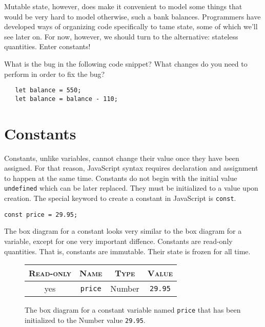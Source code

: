  Mutable state, however, does make it convenient to model some things that would be very hard to model otherwise, such a bank balances. Programmers have developed ways of organizing code specifically to tame state, some of which we'll see later on. For now, however, we should turn to the alternative: stateless quantities. Enter constants!

 \begin{question}
   What is the bug in the following code snippet? What changes do you need to perform in order to fix the bug?
   \begin{lstlisting}
   let balance = 550;
   let balance = balance - 110;
   \end{lstlisting}
 \end{question}

\section{Constants}
Constants, unlike variables, cannot change their value once they have been assigned. For that reason, JavaScript syntax requires declaration and assignment to happen at the same time. Constants do not begin with the initial value \texttt{undefined} which can be later replaced. They must be initialized to a value upon creation. The special keyword to create a constant in JavaScript is \texttt{const}.

\begin{lstlisting}
const price = 29.95;
\end{lstlisting}

The box diagram for a constant looks very similar to the box diagram for a variable, except for one very important diffence. Constants are read-only quantities. That is, constants are immutable. Their state is frozen for all time.

\begin{figure}[h]
  \sffamily
  \color{cyan}
  \begin{tabular}{|c|c|c|c|}
    \hline
    \textsc{Read-only} & \textsc{Name} & \textsc{Type} & \textsc{Value}\\
    \hline
    yes & \texttt{price} & Number & \texttt{29.95}\\
    \hline
  \end{tabular}
  \caption{\label{fig:intro-constant} The box diagram for a constant variable named \texttt{price} that has been initialized to the \textsf{Number} value \texttt{29.95}.}
\end{figure}

